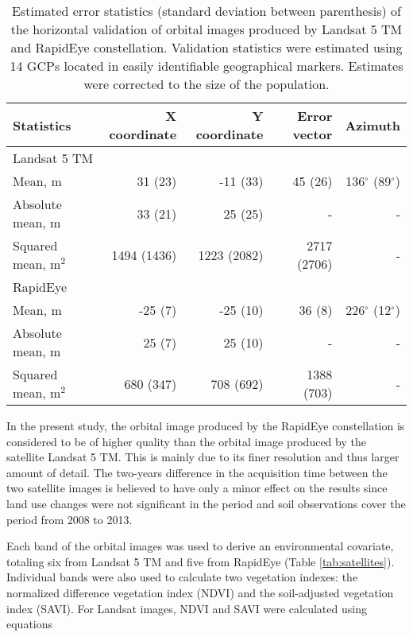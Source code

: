 \begin{table}[ht]
  \caption{Estimated error statistics (standard deviation between parenthesis) of the horizontal validation of orbital images produced by Landsat 5 TM and RapidEye constellation. Validation statistics were estimated using 14 GCPs located in easily identifiable geographical markers. Estimates were corrected to the size of the population.}
  \label{tab:satellite-geo-val}
  \centering
  {\small
  \begin{tabular}{lrrrr}
    \hline
    Statistics           & X coordinate & Y coordinate  & Error vector  & Azimuth              \\
    \hline
    \multicolumn{5}{l}{Landsat 5 TM}                                                           \\
    \hline
    Mean, m              & 31   (23)   & -11  (33)   & 45   (26)   & 136$^\circ$ (89$^\circ$)  \\ 
    Absolute mean, m     & 33   (21)   & 25   (25)   & -           & -                         \\ 
    Squared mean, m$^2$  & 1494 (1436) & 1223 (2082) & 2717 (2706) & -                         \\ 
    \hline
    \multicolumn{5}{l}{RapidEye}                                                               \\
    \hline
    Mean, m              & -25  (7)     & -25 (10)   & 36   (8)     & 226$^\circ$ (12$^\circ$) \\ 
    Absolute mean, m     & 25   (7)     & 25  (10)   & -            & -                        \\ 
    Squared mean, m$^2$  & 680  (347)   & 708 (692)  & 1388 (703)   & -                        \\ 
    \hline
  \end{tabular}}
\end{table}

In the present study, the orbital image produced by the RapidEye constellation is considered to be of higher quality than the orbital image produced by the satellite Landsat 5 TM. This is mainly due to its finer resolution and thus larger amount of detail. The two-years difference in the acquisition time between the two satellite images is believed to have only a minor effect on the results since land use changes were not significant in the period and soil observations cover the period from 2008 to 2013.

Each band of the orbital images was used to derive an environmental covariate, totaling six from Landsat 5 TM and five from RapidEye (Table \ref{tab:satellites}). Individual bands were also used to calculate two vegetation indexes: the normalized difference vegetation index (NDVI) and the soil-adjusted vegetation index (SAVI). For Landsat images, NDVI and SAVI were calculated using equations

